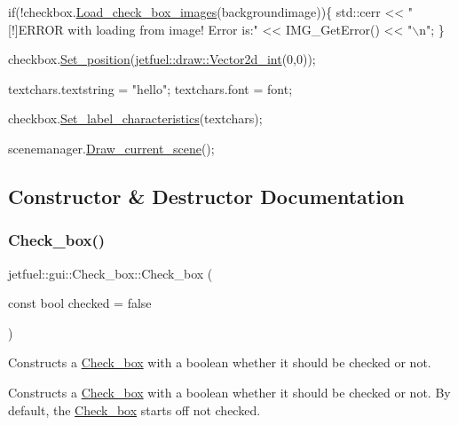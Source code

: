 \begin{DoxyCode}
\textcolor{keywordflow}{if}(!checkbox.\hyperlink{classjetfuel_1_1gui_1_1Check__box_adadc280e5d14f08e64f974ba9156cd16}{Load\_check\_box\_images}(backgroundimage))\{
    std::cerr << \textcolor{stringliteral}{"[!]ERROR with loading from image! Error is:"} <<
    IMG\_GetError() << \textcolor{stringliteral}{"\(\backslash\)n"};
\}

checkbox.\hyperlink{classjetfuel_1_1gui_1_1Check__box_aca11db17630485a2c44b19780d10cce6}{Set\_position}(\hyperlink{classjetfuel_1_1draw_1_1Vector2d}{jetfuel::draw::Vector2d\_int}(0,0));

textchars.textstring = \textcolor{stringliteral}{"hello"};
textchars.font = font;

checkbox.\hyperlink{classjetfuel_1_1gui_1_1Check__box_aa7dbb21f37090d3a595d0111acc721b3}{Set\_label\_characteristics}(textchars);

scenemanager.\hyperlink{classjetfuel_1_1draw_1_1Scene__manager_a8af9a3abfd5121b1b8556342de435773}{Draw\_current\_scene}();
\end{DoxyCode}
 

\subsection{Constructor \& Destructor Documentation}
\mbox{\label{classjetfuel_1_1gui_1_1Check__box_a1e0e07940cfa643c1f019830042553bd}} 
\subsubsection{\texorpdfstring{Check\+\_\+box()}{Check\_box()}}
{\footnotesize\ttfamily jetfuel\+::gui\+::\+Check\+\_\+box\+::\+Check\+\_\+box (\begin{DoxyParamCaption}\item[{const bool}]{checked = {\ttfamily false} }\end{DoxyParamCaption})}



Constructs a \hyperlink{classjetfuel_1_1gui_1_1Check__box}{Check\+\_\+box} with a boolean whether it should be checked or not. 

Constructs a \hyperlink{classjetfuel_1_1gui_1_1Check__box}{Check\+\_\+box} with a boolean whether it should be checked or not. By default, the \hyperlink{classjetfuel_1_1gui_1_1Check__box}{Check\+\_\+box} starts off not checked.


